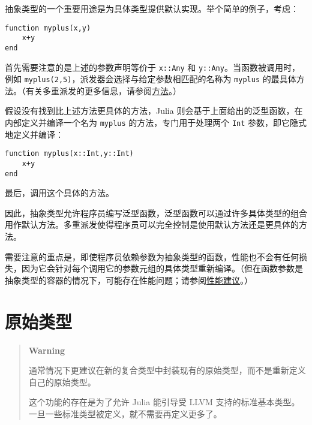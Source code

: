 抽象类型的一个重要用途是为具体类型提供默认实现。举个简单的例子，考虑：




\begin{verbatim}
function myplus(x,y)
    x+y
end
\end{verbatim}



首先需要注意的是上述的参数声明等价于 \texttt{x::Any} 和 \texttt{y::Any}。当函数被调用时，例如 \texttt{myplus(2,5)}，派发器会选择与给定参数相匹配的名称为 \texttt{myplus} 的最具体方法。（有关多重派发的更多信息，请参阅\hyperlink{3842379394166369470}{方法}。）



假设没有找到比上述方法更具体的方法，Julia 则会基于上面给出的泛型函数，在内部定义并编译一个名为 \texttt{myplus} 的方法，专门用于处理两个 \texttt{Int} 参数，即它隐式地定义并编译：




\begin{verbatim}
function myplus(x::Int,y::Int)
    x+y
end
\end{verbatim}



最后，调用这个具体的方法。



因此，抽象类型允许程序员编写泛型函数，泛型函数可以通过许多具体类型的组合用作默认方法。多重派发使得程序员可以完全控制是使用默认方法还是更具体的方法。



需要注意的重点是，即使程序员依赖参数为抽象类型的函数，性能也不会有任何损失，因为它会针对每个调用它的参数元组的具体类型重新编译。（但在函数参数是抽象类型的容器的情况下，可能存在性能问题；请参阅\hyperlink{16419743784254835624}{性能建议}。）



\hypertarget{7048513132833584013}{}


\section{原始类型}



\begin{quote}
\textbf{Warning}

通常情况下更建议在新的复合类型中封装现有的原始类型，而不是重新定义自己的原始类型。

这个功能的存在是为了允许 Julia 能引导受 LLVM 支持的标准基本类型。一旦一些标准类型被定义，就不需要再定义更多了。

\end{quote}


